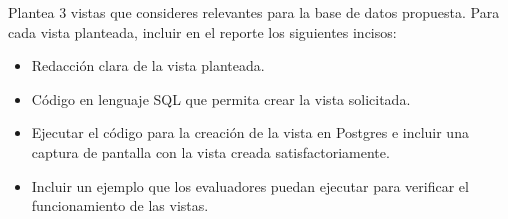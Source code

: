 Plantea 3 vistas que consideres relevantes para la base de datos propuesta. Para cada vista planteada, incluir en el reporte los siguientes incisos:
\begin{itemize}
    \item Redacción clara de la vista planteada.
    \item Código en lenguaje SQL que permita crear la vista solicitada.
    \item Ejecutar el código para la creación de la vista en Postgres e incluir una captura de pantalla
    con la vista creada satisfactoriamente.
    \item Incluir un ejemplo que los evaluadores puedan ejecutar para verificar el funcionamiento
    de las vistas.
\end{itemize}